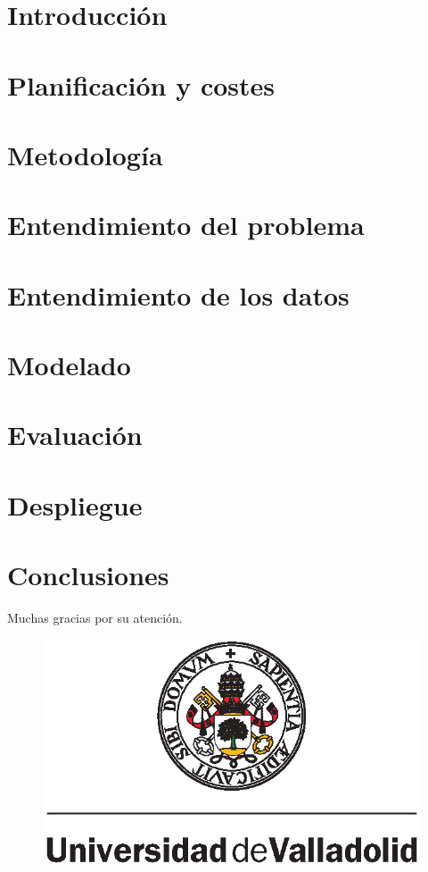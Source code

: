 \documentclass[xcolor=dvipsnames]{beamer}
\begin{document}
\AtBeginSection{\frame{\sectionpage}}




\section{Introducción}


\section{Planificación y costes}


\section{Metodología}


\section{Entendimiento del problema}


\section{Entendimiento de los datos}


\section{Modelado}


\section{Evaluación}


\section{Despliegue}


\section{Conclusiones}


\begin{frame}
\begin{center}
        {\Huge Muchas gracias por su atención.}
    \end{center}
    \begin{figure}[H]
        \begin{center}
            \includegraphics[width=0.25\linewidth]{img/uva.eps}
        \end{center}
    \end{figure}

\end{frame}
\end{document}
